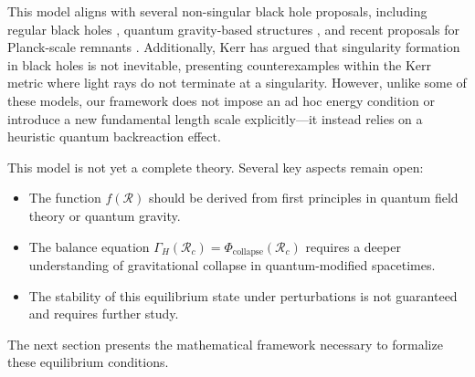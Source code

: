 This model aligns with several non-singular black hole proposals, including regular black holes \cite{bardeen1968non, hayward2006formation}, quantum gravity-based structures \cite{bojowald2005nonsingular, rovelli1996black}, and recent proposals for Planck-scale remnants \cite{brustein2018black}. Additionally, Kerr \cite{kerr2023singularities} has argued that singularity formation in black holes is not inevitable, presenting counterexamples within the Kerr metric where light rays do not terminate at a singularity. However, unlike some of these models, our framework does not impose an ad hoc energy condition or introduce a new fundamental length scale explicitly—it instead relies on a heuristic quantum backreaction effect.

This model is not yet a complete theory. Several key aspects remain open:
\begin{itemize}
    \item The function \( f(\mathcal{R}) \) should be derived from first principles in quantum field theory or quantum gravity.
    \item The balance equation \( \Gamma_H(\mathcal{R}_c) = \Phi_{\text{collapse}}(\mathcal{R}_c) \) requires a deeper understanding of gravitational collapse in quantum-modified spacetimes.
    \item The stability of this equilibrium state under perturbations is not guaranteed and requires further study.
\end{itemize}

The next section presents the mathematical framework necessary to formalize these equilibrium conditions.
